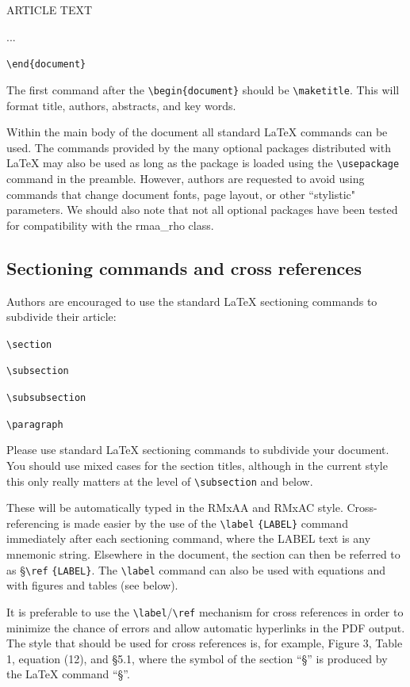 \documentclass[11pt,proc,twoside]{RMxAC_rho-class/RMxAC_rho}
\newcommand{\CS}[1]{\texttt{\textbackslash #1}}
\begin{document}
ARTICLE TEXT

...

\CS{end}\verb+{document}+
\bigskip

The first command after the \CS{begin}\verb+{document}+ should be \CS{maketitle}. This will format title, authors, abstracts, and key words.

Within the main body of the document all standard \LaTeX{} commands can be used. The commands provided by the many optional packages distributed with \LaTeX{} may also be used as long as the package is loaded using the \CS{usepackage} command in the preamble. However, authors are requested to avoid using commands that change document fonts, page layout, or other ``stylistic" parameters. We should also note that not all optional packages have been tested for compatibility with the rmaa\_rho class.

\subsection{Sectioning commands and cross references}

Authors are encouraged to use the standard \LaTeX{} sectioning commands to subdivide their article:

\bigskip

\CS{section}

\CS{subsection}

\CS{subsubsection}

\CS{paragraph}

\bigskip

Please use standard \LaTeX{} sectioning commands to subdivide your document. You should use mixed cases for the section titles, although in the current style this only really matters at the level of \CS{subsection} and below.

These will be automatically typed in the RMxAA and RMxAC style. Cross-referencing is made easier by the use of the \CS{label} 
 \verb+{LABEL}+ command immediately after each sectioning command, where the LABEL text is any mnemonic string. Elsewhere in the document, the section can then be referred to as \S \CS{ref} \verb+{LABEL}+. The \CS{label} command can also be used with equations and with figures and tables (see below). 

It is preferable to use the \CS{label}/\CS{ref} mechanism for cross references in order to minimize the chance of errors and
allow automatic hyperlinks in the PDF output. The style that should be used for cross references is, for example, Figure 3, Table 1, equation (12), and \S 5.1, where the symbol of the section “§” is produced by the \LaTeX{} command “\S”.
\end{document}
